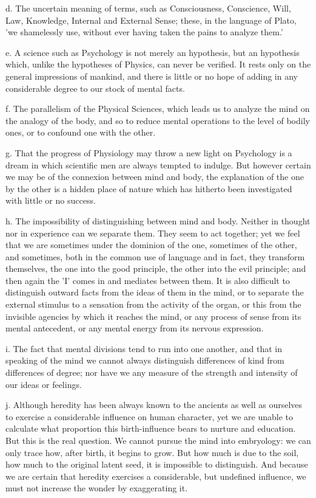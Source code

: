 d. The uncertain meaning of terms, such as Consciousness, Conscience,
Will, Law, Knowledge, Internal and External Sense; these, in the
language of Plato, 'we shamelessly use, without ever having taken the
pains to analyze them.'

e. A science such as Psychology is not merely an hypothesis, but
an hypothesis which, unlike the hypotheses of Physics, can never be
verified. It rests only on the general impressions of mankind, and there
is little or no hope of adding in any considerable degree to our stock
of mental facts.

f. The parallelism of the Physical Sciences, which leads us to analyze
the mind on the analogy of the body, and so to reduce mental operations
to the level of bodily ones, or to confound one with the other.

g. That the progress of Physiology may throw a new light on Psychology
is a dream in which scientific men are always tempted to indulge. But
however certain we may be of the connexion between mind and body, the
explanation of the one by the other is a hidden place of nature which
has hitherto been investigated with little or no success.

h. The impossibility of distinguishing between mind and body. Neither
in thought nor in experience can we separate them. They seem to act
together; yet we feel that we are sometimes under the dominion of the
one, sometimes of the other, and sometimes, both in the common use of
language and in fact, they transform themselves, the one into the good
principle, the other into the evil principle; and then again the 'I'
comes in and mediates between them. It is also difficult to distinguish
outward facts from the ideas of them in the mind, or to separate the
external stimulus to a sensation from the activity of the organ, or this
from the invisible agencies by which it reaches the mind, or any process
of sense from its mental antecedent, or any mental energy from its
nervous expression.

i. The fact that mental divisions tend to run into one another, and that
in speaking of the mind we cannot always distinguish differences of kind
from differences of degree; nor have we any measure of the strength and
intensity of our ideas or feelings.

j. Although heredity has been always known to the ancients as well as
ourselves to exercise a considerable influence on human character, yet
we are unable to calculate what proportion this birth-influence bears to
nurture and education. But this is the real question. We cannot pursue
the mind into embryology: we can only trace how, after birth, it begins
to grow. But how much is due to the soil, how much to the original
latent seed, it is impossible to distinguish. And because we are certain
that heredity exercises a considerable, but undefined influence, we must
not increase the wonder by exaggerating it.

